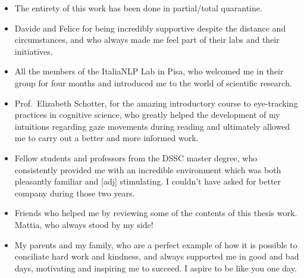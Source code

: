 \documentclass[a4paper, nobind]{templates/ociamthesis}
\begin{document}
\begin{romanpages}

\maketitle

\null\newpage

\titlespacing*{\chapter}{0pt}{0pt}{35pt}


\begin{acknowledgements}
 	\begin{itemize}
  \item
    The entirety of this work has been done in partial/total quarantine.
  \item
    Davide and Felice for being incredibly supportive despite the distance and circumstances, and who always made me feel part of their labs and their initiatives.
  \item
    All the members of the ItaliaNLP Lab in Pisa, who welcomed me in their group for four months and introduced me to the world of scientific research.
  \item
    Prof.~Elizabeth Schotter, for the amazing introductory course to eye-tracking practices in cognitive science, who greatly helped the development of my intuitions regarding gaze movements during reading and ultimately allowed me to carry out a better and more informed work.
  \item
    Fellow students and professors from the DSSC master degree, who consistently provided me with an incredible environment which was both pleasantly familiar and {[}adj{]} stimulating. I couldn't have asked for better company during those two years.
  \item
    Friends who helped me by reviewing some of the contents of this thesis work. Mattia, who always stood by my side!
  \item
    My parents and my family, who are a perfect example of how it is possible to conciliate hard work and kindness, and always supported me in good and bad days, motivating and inspiring me to succeed. I aspire to be like you one day.
  \end{itemize}
\end{acknowledgements}


\end{romanpages}
\end{document}
